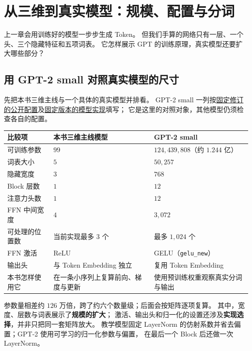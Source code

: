 \chapterrule
\section{从三维到真实模型：规模、配置与分词}
\label{intro:23a-from-toy-to-gpt}

上一章会用训练好的模型一步步生成 Token。
但我们手算的网络只有一层、一个头、三个隐藏特征和五项词表。
它怎样展示 GPT 的训练原理，真实模型还要扩大哪些部分？

\subsection{用 GPT-2 small 对照真实模型的尺寸}
\label{sec:toy-real-model-comparison}

先把本书三维主线与一个具体的真实模型并排看。
GPT-2 small 一列按\href{https://huggingface.co/openai-community/gpt2/blob/607a30d783dfa663caf39e06633721c8d4cfcd7e/config.json}{固定修订的公开配置}及\hyperref[source:gpt2-implementation]{固定版本的模型实现}填写；
它是这里的对照对象，其他模型仍须检查各自的配置。

\begin{center}\small
\renewcommand{\arraystretch}{1.25}
\begin{tabularx}{\linewidth}{@{}p{30mm}XX@{}}
\toprule
比较项 & 本书三维主线模型 & GPT-2 small\\\midrule
可训练参数 & $99$ & $124{,}439{,}808$（约 $1.244$ 亿）\\
词表大小 & $5$ & $50{,}257$\\
隐藏宽度 & $3$ & $768$\\
Block 层数 & $1$ & $12$\\
注意力头数 & $1$ & $12$\\
FFN 中间宽度 & $4$ & $3{,}072$\\
可处理的位置数 & 当前实现最多 $3$ 个 & 最多 $1{,}024$ 个\\
FFN 激活 & ReLU & GELU（\texttt{gelu\_new}）\\
输出头 & 与 Token Embedding 独立 & 复用 Token Embedding\\
本书怎样使用它 & 在一条小序列上复算前向、梯度与更新 & 使用预训练权重观察真实分词与输出\\
\bottomrule
\end{tabularx}
\end{center}

参数量相差约 $126$ 万倍，跨了约六个数量级；后面会按矩阵逐项复算。
其中，宽度、层数与词表展示了\textbf{规模的扩大}；
激活、输出头和归一化的设置还涉及\textbf{实现选择}，并非只把同一套矩阵放大。
教学模型固定 LayerNorm 的仿射系数并省去偏置；GPT-2 使用可学习的归一化参数与偏置，
在最后一个 Block 后还做一次 LayerNorm。

